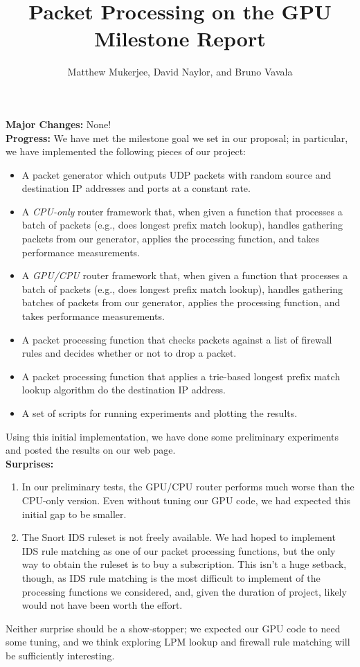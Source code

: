 \documentclass[12pt]{article}
\title{Packet Processing on the GPU\\\small{Milestone Report}}
\author{Matthew Mukerjee, David Naylor, and Bruno Vavala}
\date{} %
\begin{document}
\maketitle

\noindent \textbf{Major Changes:} None!\\

\noindent \textbf{Progress:} We have met the milestone goal we set in our proposal; in particular, we have implemented the following pieces of our project:
\begin{itemize}
	\item A packet generator which outputs UDP packets with random source and destination IP addresses and ports at a constant rate.
	
	\item A \emph{CPU-only} router framework that, when given a function that processes a batch of packets (e.g., does longest prefix match lookup), handles gathering packets from our generator, applies the processing function, and takes performance measurements.
	
	\item A \emph{GPU/CPU} router framework that, when given a function that processes a batch of packets (e.g., does longest prefix match lookup), handles gathering batches of packets from our generator, applies the processing function, and takes performance measurements.
	
	\item A packet processing function that checks packets against a list of firewall rules and decides whether or not to drop a packet.
	
	\item A packet processing function that applies a trie-based longest prefix match lookup algorithm do the destination IP address.
	
	\item A set of scripts for running experiments and plotting the results.
\end{itemize}
Using this initial implementation, we have done some preliminary experiments and posted the results on our web page.\\


\noindent \textbf{Surprises:}
\begin{enumerate}
	\item In our preliminary tests, the GPU/CPU router performs much worse than the CPU-only version. Even without tuning our GPU code, we had expected this initial gap to be smaller.

	\item The Snort IDS ruleset is not freely available. We had hoped to implement IDS rule matching as one of our packet processing functions, but the only way to obtain the ruleset is to buy a subscription. This isn't a huge setback, though, as IDS rule matching is the most difficult to implement of the processing functions we considered, and, given the duration of project, likely would not have been worth the effort.
\end{enumerate}
Neither surprise should be a show-stopper; we expected our GPU code to need some tuning, and we think exploring LPM lookup and firewall rule matching will be sufficiently interesting.\\
\end{document}
